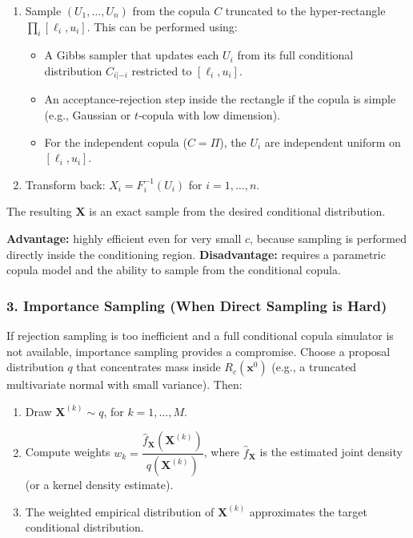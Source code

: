 \begin{enumerate}
    \item Sample $(U_1,\dots,U_n)$ from the copula $C$ truncated to the hyper‑rectangle $\prod_i [\ell_i, u_i]$. This can be performed using:
    \begin{itemize}
        \item A Gibbs sampler that updates each $U_i$ from its full conditional distribution $C_{i| -i}$ restricted to $[\ell_i, u_i]$.
        \item An acceptance‑rejection step inside the rectangle if the copula is simple (e.g., Gaussian or $t$‑copula with low dimension).
        \item For the independent copula ($C=\Pi$), the $U_i$ are independent uniform on $[\ell_i, u_i]$.
    \end{itemize}
    \item Transform back: $X_i = F_i^{-1}(U_i)$ for $i=1,\dots,n$.
\end{enumerate}

The resulting $\mathbf{X}$ is an exact sample from the desired conditional distribution.

\textbf{Advantage:} highly efficient even for very small $c$, because sampling is performed directly inside the conditioning region.
\textbf{Disadvantage:} requires a parametric copula model and the ability to sample from the conditional copula.

\subsubsection*{3. Importance Sampling (When Direct Sampling is Hard)}

If rejection sampling is too inefficient and a full conditional copula simulator is not available, importance sampling provides a compromise. Choose a proposal distribution $q$ that concentrates mass inside $R_c(\mathbf{x}^0)$ (e.g., a truncated multivariate normal with small variance). Then:

\begin{enumerate}
    \item Draw $\mathbf{X}^{(k)} \sim q$, for $k=1,\dots,M$.
    \item Compute weights $w_k = \dfrac{\hat{f}_{\mathbf{X}}(\mathbf{X}^{(k)})}{q(\mathbf{X}^{(k)})}$, where $\hat{f}_{\mathbf{X}}$ is the estimated joint density (or a kernel density estimate).
    \item The weighted empirical distribution of $\mathbf{X}^{(k)}$ approximates the target conditional distribution.
\end{enumerate}

